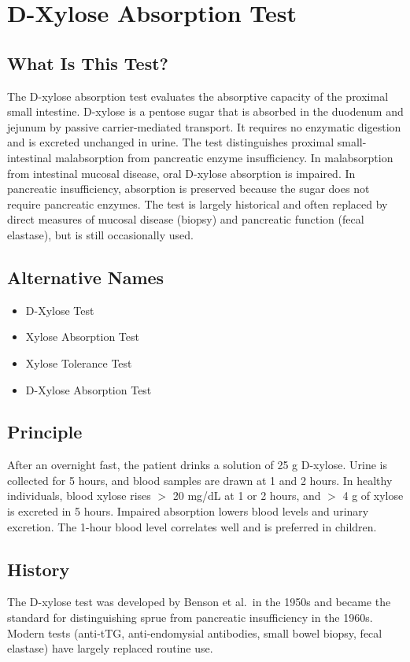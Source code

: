 \chapter{D-Xylose Absorption Test}

\section*{What Is This Test?}
The D-xylose absorption test evaluates the absorptive capacity of the proximal small intestine. D-xylose is a pentose sugar that is absorbed in the duodenum and jejunum by passive carrier-mediated transport. It requires no enzymatic digestion and is excreted unchanged in urine. The test distinguishes proximal small-intestinal malabsorption from pancreatic enzyme insufficiency. In malabsorption from intestinal mucosal disease, oral D-xylose absorption is impaired. In pancreatic insufficiency, absorption is preserved because the sugar does not require pancreatic enzymes. The test is largely historical and often replaced by direct measures of mucosal disease (biopsy) and pancreatic function (fecal elastase), but is still occasionally used.

\section*{Alternative Names}
\begin{itemize}
  \item D-Xylose Test
  \item Xylose Absorption Test
  \item Xylose Tolerance Test
  \item D-Xylose Absorption Test
\end{itemize}
\section*{Principle}
After an overnight fast, the patient drinks a solution of 25 g D-xylose. Urine is collected for 5 hours, and blood samples are drawn at 1 and 2 hours. In healthy individuals, blood xylose rises $>$ 20 mg/dL at 1 or 2 hours, and $>$ 4 g of xylose is excreted in 5 hours. Impaired absorption lowers blood levels and urinary excretion. The 1-hour blood level correlates well and is preferred in children.

\section*{History}
The D-xylose test was developed by Benson et al.\ in the 1950s and became the standard for distinguishing sprue from pancreatic insufficiency in the 1960s. Modern tests (anti-tTG, anti-endomysial antibodies, small bowel biopsy, fecal elastase) have largely replaced routine use.


